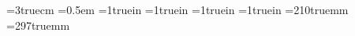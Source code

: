 \def\lxBindingLeft{\lxBindingLefttrue}
\def\lxBindingRight{\lxBindingLeftfalse}
\def\lxDoubleSided{\lxDoubleSidedtrue}
\def\lxSingleSided{\lxDoubleSidedfalse}
\def\lxNotesOuter{\lxNotesOutertrue}
\def\lxNotesInner{\lxNotesOuterfalse}

%
%
%
%

\newdimen\lxMarginWidth
\newdimen\lxMarginSep
\newdimen\lxInnerMargin
\newdimen\lxOuterMargin
\newdimen\lxTopMargin
\newdimen\lxBottomMargin
\newdimen\lxPaperWidth    %
\newdimen\lxPaperHeight   %
\newdimen\lxPageWidth     %
\newdimen\lxPageHeight    %

\lxMarginWidth=3truecm    %
\lxMarginSep=0.5em
\lxInnerMargin=1truein
\lxOuterMargin=1truein
\lxTopMargin=1truein
\lxBottomMargin=1truein
\lxPaperWidth=210truemm   %
\lxPaperHeight=297truemm  %


\def\lxNoteFont{\the\scriptfont0 \spacing{7}{10}}

